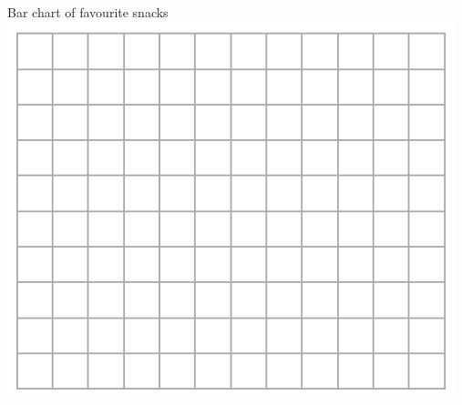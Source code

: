 \documentclass{article}
\begin{document}
\begin{enumerate}
\begin{center}
    Bar chart of favourite snacks \\
    \vspace{5pt}
    \includegraphics[width=13cm]{Exams/10_by_10_grid.png}
    \vspace{5pt}
\end{center}

\end{enumerate}
\end{document}
